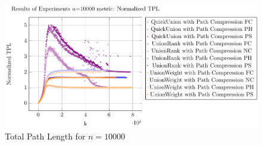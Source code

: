 \documentclass[10pt,a4paper,hidelinks]{article}
\begin{document}
\begin{description}
    \begin{figure}[h]
        \centering
        \includegraphics[width=\linewidth]{plots/plot_10000_Normalized TPL.pdf}
        \caption{Total Path Length for $n = 10000$}
    \end{figure}
\end{description}
\end{document}
